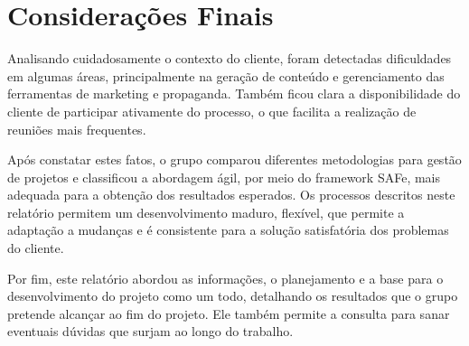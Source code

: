 \chapter{Considerações Finais}
Analisando cuidadosamente o contexto do cliente, foram detectadas dificuldades em algumas áreas, principalmente
na geração de conteúdo e gerenciamento das ferramentas de marketing e propaganda. Também ficou clara a disponibilidade
 do cliente de participar ativamente do processo, o que facilita a realização de reuniões mais frequentes.

Após constatar estes fatos, o grupo comparou diferentes metodologias para gestão de projetos e classificou a abordagem
 ágil, por meio do framework SAFe, mais adequada para a obtenção dos resultados esperados. Os processos descritos neste
 relatório permitem um desenvolvimento maduro, flexível, que permite a adaptação a mudanças e é consistente para a solução
  satisfatória dos problemas do cliente.

Por fim, este relatório abordou as informações, o planejamento e a base para o desenvolvimento do projeto como um
 todo, detalhando os resultados que o grupo pretende alcançar ao fim do projeto. Ele também permite a consulta para
  sanar  eventuais dúvidas que surjam ao longo do trabalho.
